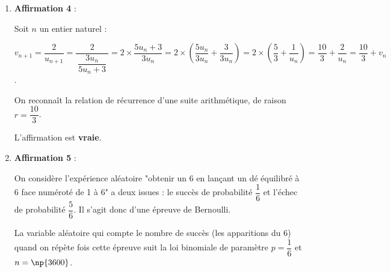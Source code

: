 \begin{enumerate}
		On peut résoudre l'inéquation sur l'intervalle $]7 ; +\infty[$, et on a :

		$\begin{aligned}[t] \forall x \in ]7 ;+\infty[, \quad
		\ln \left(2x^2 - 6x - 56\right) \geqslant \ln(4x - 8)
		& \iff 2x^2 - 6x - 56 \geqslant 4x - 8 \quad &\text{car la fonction ln est}\\
		&&\text{croissante sur }\R^{*+}\\
		& \iff 2x^2 - 10x - 48 \geqslant 0 \\
		& \iff x^2-5x-24 \geqslant 0&\text{car }2 >0
		\end{aligned}$

		Le discriminant est :\quad $\Delta = b^2-4ac = 121$,\quad donc la fonction du second degré \quad $x \longmapsto x^2-5x-24$ \quad admet deux racines :\quad $-3$ et 8.

		Le coefficient du terme de degré 2 est $a=1$, donc cette fonction est positive sur $]-\infty  ; -3] \cup [8 ;+\infty[$.

		Sur $]7  ; + \infty[$, l'inéquation a pour ensemble de solutions l'intervalle $[8 ; +\infty[$.

		L'affirmation est \textbf{vraie}.

		\item \textbf{Affirmation 4} :

		Soit $n$ un entier naturel :

		$v_{n+1} = \dfrac{2}{u_{n+1}} = \dfrac{2}{~\dfrac{3u_n}{5u_n+3}~} = 2\times \dfrac{5u_n + 3}{3u_n} = 2\times \left(\dfrac{5u_n}{3u_n} + \dfrac{3}{3u_n}\right) = 2\times \left(\dfrac{5}{3} + \dfrac{1}{u_n}\right) = \dfrac{10}{3} + \dfrac{2}{u_n} = \dfrac{10}{3} + v_n$.

		On reconnaît la relation de récurrence d'une suite arithmétique, de raison $r = \dfrac{10}{3}$.

		L'affirmation est \textbf{vraie}.

		\item \textbf{Affirmation 5} :

		On considère l'expérience aléatoire "obtenir un 6 en lançant un dé équilibré à 6 face numéroté de 1 à 6" a deux issues : le succès de probabilité $\dfrac16$ et l'échec de probabilité $\dfrac56$. Il s'agit donc d'une épreuve de Bernoulli.

		La variable aléatoire qui compte le nombre de succès (les apparitions du 6) quand on répète  fois cette épreuve suit la loi binomiale de paramètre $p=\dfrac16$ et $n=\np{3600}$.


\end{enumerate}
